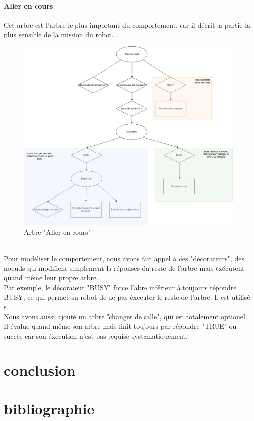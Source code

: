 \documentclass[titlepage]{article}
\begin{document}
	\paragraph{Aller en cours}
	Cet arbre est l'arbre le plus important du comportement, car il décrit la partie la plus sensible de la mission du robot.
	\begin{figure}[h!]
		\centering
		\includegraphics[width=\linewidth]{img/BT_5.png}
		\caption{Arbre "Aller en cours"}
		\label{fig:exemple_4}
	\end{figure}
	\\
	Pour modéliser le comportement, nous avons fait appel à des "décorateurs", des noeuds qui modifient simplement la réponses du reste de l'arbre mais éxécutent quand même leur propre arbre. 
	\\
	Par exemple, le décorateur "BUSY" force l'abre inférieur à toujours répondre BUSY, ce qui permet au robot de ne pas éxecuter le reste de l'arbre. Il est utilisé s
	\\
	Nous avons aussi ajouté un arbre "changer de salle", qui est totalement optionel. Il  évalue quand même son arbre mais finit toujours par répondre "TRUE" ou succès car son éxecution n'est pas requise systématiquement.
	
	\clearpage
	\section{conclusion}
	\clearpage
	\section{bibliographie}
	
	
\end{document}

